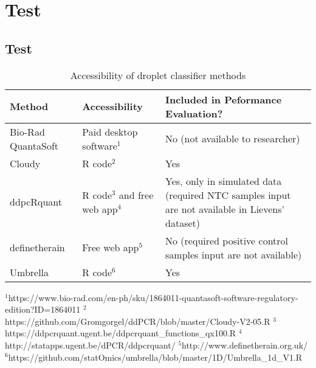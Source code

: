 \chapter{Test}
\section{Test}



\bgroup
\def\arraystretch{2}%
\begin{table}[]
    \caption{Accessibility of droplet classifier methods}
    \begin{tabularx}{\textwidth}{p{2.7cm}Xp{5.5cm}}
    \toprule
    \textbf{Method}    & \textbf{Accessibility}                 & \textbf{Included in Peformance Evaluation?} \\ 
    \midrule
    Bio-Rad QuantaSoft & Paid desktop software\(^1\)            & No \newline (not available to researcher)                                                         \\ 
    Cloudy             & R code\(^2\)                           & Yes \newline                                                                                                     \\ 
    ddpcRquant         & R code\(^3\) and free web app\(^4\)    & Yes, only in simulated data \newline (required NTC samples input are not available in Lievens’ dataset) \\ 
    definetherain      & Free web app\(^5\)                     & No \newline (required positive control samples input are not available)                                 \\ 
    Umbrella           & R code\(^6\)                           & Yes                                                                                                     \\ 
    \bottomrule
    \end{tabularx}
    {\scriptsize 
    \(^1\)https://www.bio-rad.com/en-ph/sku/1864011-quantasoft-software-regulatory-edition?ID=1864011 \newline
    \(^2\)https://github.com/Gromgorgel/ddPCR/blob/master/Cloudy-V2-05.R \newline
    \(^3\)https://ddpcrquant.ugent.be/ddpcrquant\_functions\_qx100.R \newline
    \(^4\)http://statapps.ugent.be/dPCR/ddpcrquant/\newline
    \(^5\)http://www.definetherain.org.uk/ \newline
    \(^6\)https://github.com/statOmics/umbrella/blob/master/1D/Umbrella\_1d\_V1.R
    }
\end{table}
\egroup
